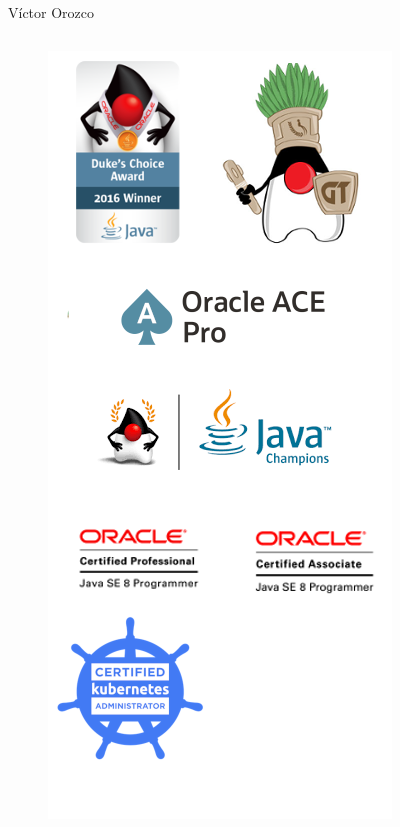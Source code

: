 \documentclass[aspectratio=169]{beamer}
\begin{document}
\begin{frame}{Víctor Orozco}
	\begin{columns}[T] %
		
		\begin{column}[T]{4cm} %
			\begin{figure}
				\centering
				\includegraphics[width=0.8\linewidth]{Images/logos}
			\end{figure}

\end{column}
\end{columns}
\end{frame}
\end{document}

